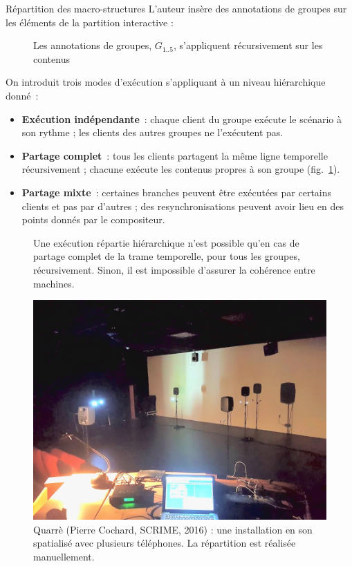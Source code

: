 \begin{block}{Répartition des macro-structures}
    L'auteur insère des annotations de groupes sur les éléments de la partition interactive : 
    
    \begin{figure}
        \begin{tikzpicture}[scale=4]
        
        \end{tikzpicture}
        \caption{Les annotations de groupes, $G_{1..5}$, s'appliquent récursivement sur les contenus}
    \end{figure}

    On introduit trois modes d'exécution s'appliquant à un niveau hiérarchique donné~:
	\begin{itemize}
		\item \textbf{Exécution indépendante}~: chaque client du groupe exécute le scénario à son rythme ; les clients des autres groupes ne l'exécutent pas.
		\item \textbf{Partage complet}~: tous les clients partagent la même ligne temporelle récursivement ; chacune exécute les contenus propres à son groupe (fig.~\ref{fig.reparti}).
		\item \textbf{Partage mixte}~: certaines branches peuvent être exécutées par certains clients et pas par d'autres ; des resynchronisations peuvent avoir lieu en des points donnés par le compositeur.
	\end{itemize}
    
    \begin{figure} 
        \centering
        \begin{tikzpicture}[scale=4]
            
        \end{tikzpicture}
        \caption{Une exécution répartie hiérarchique n'est possible qu'en cas de partage complet de la trame temporelle, pour tous les groupes, récursivement. Sinon, il est impossible d'assurer la cohérence entre machines.}
        \label{fig.reparti}
    \end{figure}
    
    \begin{figure}
        \includegraphics[scale=0.5]{images/quarre.jpg}
        \caption{Quarrè (Pierre Cochard, SCRIME, 2016) : une installation en son spatialisé avec plusieurs téléphones. La répartition est réalisée manuellement.}
    \end{figure}
\end{block}